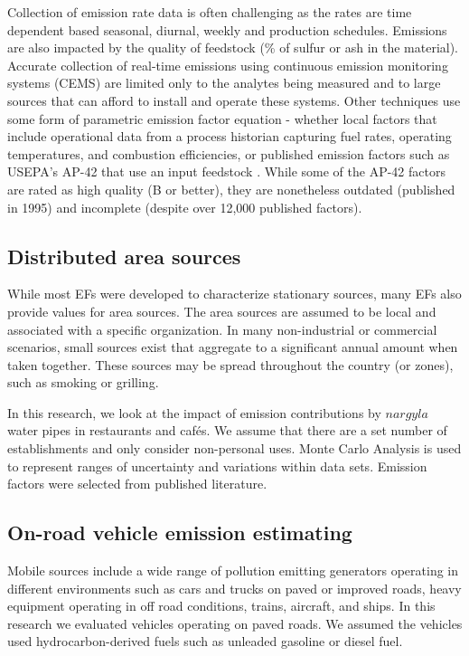 Collection of emission rate data is often challenging as the rates are time dependent based seasonal, diurnal, weekly and production schedules. Emissions are also impacted by the quality of feedstock (\% of sulfur or ash in the material). Accurate collection of real-time emissions using continuous emission monitoring systems (CEMS) are limited only to the analytes being measured and to large sources that can afford to install and operate these systems. Other techniques use some form of parametric emission factor equation - whether local factors that include operational data from a process historian capturing fuel rates, operating temperatures, and combustion efficiencies, or published emission factors such as USEPA's AP-42 that use an input feedstock \cite{USEPA1995}. While some of the AP-42 factors are rated as high quality (B or better), they are nonetheless outdated (published in 1995) and incomplete (despite over 12,000 published factors).

\subsection{Distributed area sources}
While most EFs were developed to characterize stationary sources, many EFs also provide values for area sources. The area sources are assumed to be local and associated with a specific organization. In many non-industrial or commercial scenarios, small sources exist that aggregate to a significant annual amount when taken together.  These sources may be spread throughout the country (or zones), such as smoking or grilling.

In this research, we look at the impact of emission contributions by $nargyla$ water pipes in restaurants and caf\'es. We assume that there are a set number of establishments and only consider non-personal uses.  Monte Carlo Analysis is used to represent ranges of uncertainty and variations within data sets. Emission factors were selected from published literature.

\subsection{On-road vehicle emission estimating}
Mobile sources include a wide range of pollution emitting generators operating in different environments such as cars and trucks on paved or improved roads, heavy equipment operating in off road conditions, trains, aircraft, and ships. In this research we evaluated vehicles operating on paved roads. We assumed the vehicles used hydrocarbon-derived fuels such as unleaded gasoline or diesel fuel. 

